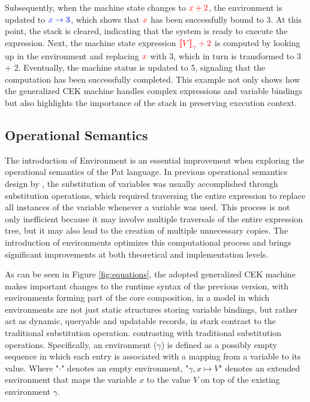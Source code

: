 \documentclass{l4proj}
\begin{document}
Subsequently, when the machine state changes to $\color{red}x + 2$, the environment is updated to $\color{blue}x \rightarrow 3$, which shows that $\color{red}x$ has been successfully bound to {\color{red}3}. At this point, the stack is cleared, indicating that the system is ready to execute the expression. Next, the machine state expression $\color{red}\text{\textlbrackdbl} V \text{\textrbrackdbl}_{\gamma} + 2$ is computed by looking up in the environment and replacing $\color{red}x$ with {\color{red}3}, which in turn is transformed to {\color{red}3} + {\color{red}2}. Eventually, the machine status is updated to {\color{red}5}, signaling that the computation has been successfully completed. This example not only shows how the generalized CEK machine handles complex expressions and variable bindings but also highlights the importance of the stack in preserving execution context. 

\subsection{Operational Semantics}

The introduction of Environment is an essential improvement when exploring the operational semantics of the Pat language. In previous operational semantics design by \cite{fowler_2023_special}, the substitution of variables was usually accomplished through substitution operations, which required traversing the entire expression to replace all instances of the variable whenever a variable was used. This process is not only inefficient because it may involve multiple traversals of the entire expression tree, but it may also lead to the creation of multiple unnecessary copies. The introduction of environments optimizes this computational process and brings significant improvements at both theoretical and implementation levels.

As can be seen in Figure \ref{fig:equations}, the adopted generalized CEK machine makes important changes to the runtime syntax of the previous version, with environments forming part of the core composition, in a model in which environments are not just static structures storing variable bindings, but rather act as dynamic, queryable and updatable records, in stark contrast to the traditional substitution operation. contrasting with traditional substitution operations. Specifically, an environment ($\gamma$) is defined as a possibly empty sequence in which each entry is associated with a mapping from a variable to its value. Where "$\cdot$" denotes an empty environment, "$\gamma, x \mapsto V$" denotes an extended environment that maps the variable $x$ to the value $V$ on top of the existing environment $\gamma$.
\end{document}

